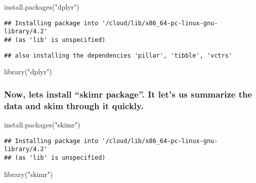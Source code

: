 \documentclass[
]{article}
\newenvironment{Shaded}{\begin{snugshade}}{\end{snugshade}}
\newcommand{\FunctionTok}[1]{\textcolor[rgb]{0.00,0.00,0.00}{#1}}
\newcommand{\NormalTok}[1]{#1}
\newcommand{\StringTok}[1]{\textcolor[rgb]{0.31,0.60,0.02}{#1}}
\begin{document}
\begin{Shaded}
\begin{Highlighting}[]
\FunctionTok{install.packages}\NormalTok{(}\StringTok{"dplyr"}\NormalTok{)}
\end{Highlighting}
\end{Shaded}

\begin{verbatim}
## Installing package into '/cloud/lib/x86_64-pc-linux-gnu-library/4.2'
## (as 'lib' is unspecified)
\end{verbatim}

\begin{verbatim}
## also installing the dependencies 'pillar', 'tibble', 'vctrs'
\end{verbatim}

\begin{Shaded}
\begin{Highlighting}[]
\FunctionTok{library}\NormalTok{(}\StringTok{"dplyr"}\NormalTok{)}
\end{Highlighting}
\end{Shaded}

\hypertarget{now-lets-install-skimr-package.-it-lets-us-summarize-the-data-and-skim-through-it-quickly.}{%
\subsubsection{Now, lets install ``skimr package''. It let's us
summarize the data and skim through it
quickly.}\label{now-lets-install-skimr-package.-it-lets-us-summarize-the-data-and-skim-through-it-quickly.}}

\begin{Shaded}
\begin{Highlighting}[]
\FunctionTok{install.packages}\NormalTok{(}\StringTok{"skimr"}\NormalTok{)}
\end{Highlighting}
\end{Shaded}

\begin{verbatim}
## Installing package into '/cloud/lib/x86_64-pc-linux-gnu-library/4.2'
## (as 'lib' is unspecified)
\end{verbatim}

\begin{Shaded}
\begin{Highlighting}[]
\FunctionTok{library}\NormalTok{(}\StringTok{"skimr"}\NormalTok{)}
\end{Highlighting}
\end{Shaded}
\end{document}
